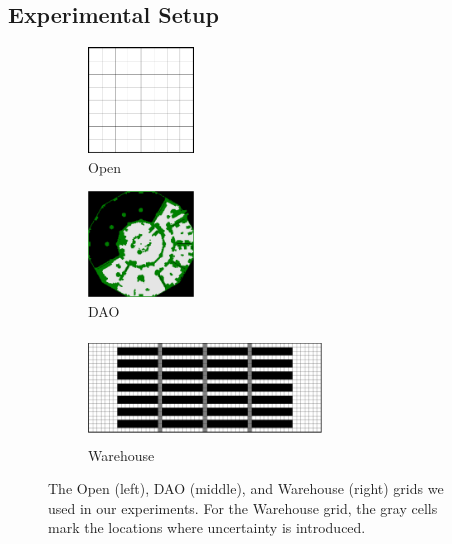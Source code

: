 \documentclass[jair,twoside,11pt,theapa]{article}
\begin{document}
\subsection{Experimental Setup}
%

\begin{figure}
     \centering
     \begin{subfigure}[b]{0.24\columnwidth}
         \centering
         \includegraphics[width=2.8cm, height=2.8cm]{Fig1.png}
         \caption{Open}
     \end{subfigure}
     \quad
     \begin{subfigure}[b]{0.24\columnwidth}
         \centering
         \includegraphics[width=2.8cm, height=2.8cm]{Fig2.png}
         \caption{DAO}
     \end{subfigure}
     \quad
     \begin{subfigure}[b]{0.4\columnwidth}
         \centering
         \includegraphics[width=6.2cm, height=2.8cm]{Fig3.png}
         \caption{Warehouse}%
     \end{subfigure}
        \caption{The Open (left), DAO (middle), and Warehouse (right) grids we used in our experiments. For the Warehouse grid, the gray cells mark the locations where uncertainty is introduced.}
        \label{fig:grid-types}
\end{figure}
\end{document}
